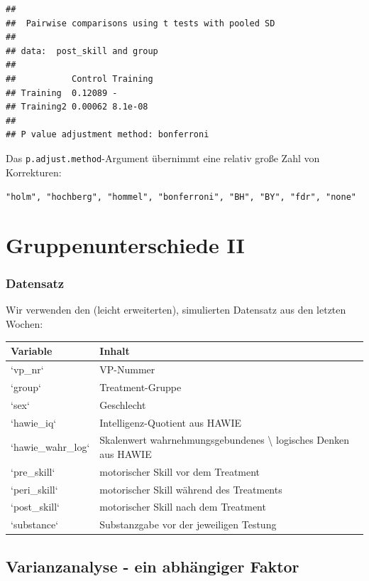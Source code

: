 \documentclass[
]{book}
\begin{document}
\begin{verbatim}
## 
##  Pairwise comparisons using t tests with pooled SD 
## 
## data:  post_skill and group 
## 
##           Control Training
## Training  0.12089 -       
## Training2 0.00062 8.1e-08 
## 
## P value adjustment method: bonferroni
\end{verbatim}

Das \texttt{p.adjust.method}-Argument übernimmt eine relativ große Zahl von Korrekturen:

\texttt{"holm",\ "hochberg",\ "hommel",\ "bonferroni",\ "BH",\ "BY",\ "fdr",\ "none"}

\hypertarget{gruppenunterschiede-ii}{%
\chapter{Gruppenunterschiede II}\label{gruppenunterschiede-ii}}

\hypertarget{datensatz-3}{%
\subsection{Datensatz}\label{datensatz-3}}

Wir verwenden den (leicht erweiterten), simulierten Datensatz aus den letzten Wochen:

\begin{tabular}[t]{ll}
\toprule
Variable & Inhalt\\
\midrule
`vp\_nr` & VP-Nummer\\
`group` & Treatment-Gruppe\\
`sex` & Geschlecht\\
`hawie\_iq` & Intelligenz-Quotient aus HAWIE\\
`hawie\_wahr\_log` & Skalenwert wahrnehmungsgebundenes \textbackslash{} logisches Denken aus HAWIE\\
\addlinespace
`pre\_skill` & motorischer Skill vor dem Treatment\\
`peri\_skill` & motorischer Skill während des Treatments\\
`post\_skill` & motorischer Skill nach dem Treatment\\
`substance` & Substanzgabe vor der jeweiligen Testung\\
\bottomrule
\end{tabular}

\hypertarget{varianzanalyse---ein-abhuxe4ngiger-faktor}{%
\section{Varianzanalyse - ein abhängiger Faktor}\label{varianzanalyse---ein-abhuxe4ngiger-faktor}}
\end{document}
